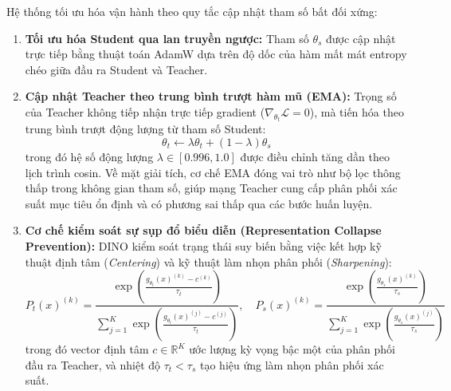 \documentclass[11pt,a4paper]{article}
\begin{document}
Hệ thống tối ưu hóa vận hành theo quy tắc cập nhật tham số bất đối xứng:
\begin{enumerate}
    \item \textbf{Tối ưu hóa Student qua lan truyền ngược:} Tham số $\theta_s$ được cập nhật trực tiếp bằng thuật toán AdamW dựa trên độ dốc của hàm mất mát entropy chéo giữa đầu ra Student và Teacher.
    \item \textbf{Cập nhật Teacher theo trung bình trượt hàm mũ (EMA):} Trọng số của Teacher không tiếp nhận trực tiếp gradient ($\nabla_{\theta_t} \mathcal{L} = 0$), mà tiến hóa theo trung bình trượt động lượng từ tham số Student:
    \begin{equation}
        \theta_t \leftarrow \lambda \theta_t + (1 - \lambda) \theta_s
    \end{equation}
    trong đó hệ số động lượng $\lambda \in [0.996, 1.0]$ được điều chỉnh tăng dần theo lịch trình cosin. Về mặt giải tích, cơ chế EMA đóng vai trò như bộ lọc thông thấp trong không gian tham số, giúp mạng Teacher cung cấp phân phối xác suất mục tiêu ổn định và có phương sai thấp qua các bước huấn luyện.
    \item \textbf{Cơ chế kiểm soát sự sụp đổ biểu diễn (Representation Collapse Prevention):} DINO kiểm soát trạng thái suy biến bằng việc kết hợp kỹ thuật định tâm (\textit{Centering}) và kỹ thuật làm nhọn phân phối (\textit{Sharpening}):
    \begin{equation}
        P_t(x)^{(k)} = \frac{\exp\left(\frac{g_{\theta_t}(x)^{(k)} - c^{(k)}}{\tau_t}\right)}{\sum_{j=1}^K \exp\left(\frac{g_{\theta_t}(x)^{(j)} - c^{(j)}}{\tau_t}\right)}, \quad P_s(x)^{(k)} = \frac{\exp\left(\frac{g_{\theta_s}(x)^{(k)}}{\tau_s}\right)}{\sum_{j=1}^K \exp\left(\frac{g_{\theta_s}(x)^{(j)}}{\tau_s}\right)}
    \end{equation}
    trong đó vector định tâm $c \in \mathbb{R}^K$ ước lượng kỳ vọng bậc một của phân phối đầu ra Teacher, và nhiệt độ $\tau_t < \tau_s$ tạo hiệu ứng làm nhọn phân phối xác suất.
\end{enumerate}
\end{document}
